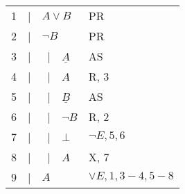 \documentclass{article}
\newcommand{\asbar}{\ |\ \ }
\begin{document}
\begin{enumerate}
          \begin{tabular}{llp{5cm}l}
              1 & | & \underline{$A\lor B$}  & PR                 \\
              2 & | & \underline{$\neg B$}   & PR                 \\
              3 & | & \asbar $\underline{A}$ & AS                 \\
              4 & | & \asbar $A$             & R, 3               \\
              5 & | & \asbar $\underline{B}$ & AS                 \\
              6 & | & \asbar $\neg B$        & R, 2               \\
              7 & | & \asbar $\bot$          & $\neg E,5,6$       \\
              8 & | & \asbar $A$             & X, 7               \\
              9 & | & $A$                    & $\lor E,1,3-4,5-8$ \\
              \hline
          \end{tabular}

\end{enumerate}
\end{document}
